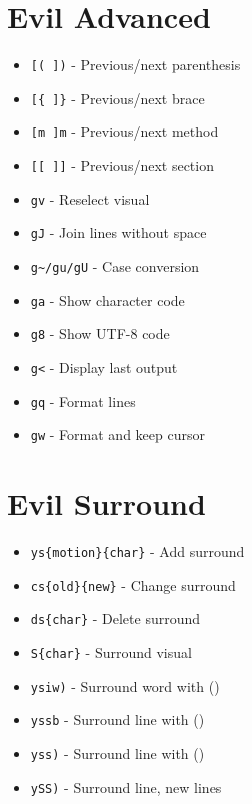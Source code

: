 \documentclass[6pt,landscape]{article}
\newcommand{\key}[1]{\texttt{#1}}
\begin{document}
\begin{multicols*}{5}
\section*{Evil Advanced}
\begin{itemize}[leftmargin=*,itemsep=0pt,parsep=0pt,topsep=0pt]
\item \key{[( ])} - Previous/next parenthesis
\item \key{[\{ ]\}} - Previous/next brace
\item \key{[m ]m} - Previous/next method
\item \key{[[ ]]} - Previous/next section
\item \key{gv} - Reselect visual
\item \key{gJ} - Join lines without space
\item \key{g\textasciitilde/gu/gU} - Case conversion
\item \key{ga} - Show character code
\item \key{g8} - Show UTF-8 code
\item \key{g<} - Display last output
\item \key{gq} - Format lines
\item \key{gw} - Format and keep cursor
\end{itemize}

\section*{Evil Surround}
\begin{itemize}[leftmargin=*,itemsep=0pt,parsep=0pt,topsep=0pt]
\item \key{ys\{motion\}\{char\}} - Add surround
\item \key{cs\{old\}\{new\}} - Change surround
\item \key{ds\{char\}} - Delete surround
\item \key{S\{char\}} - Surround visual
\item \key{ysiw)} - Surround word with ()
\item \key{yssb} - Surround line with ()
\item \key{yss)} - Surround line with ()
\item \key{ySS)} - Surround line, new lines
\end{itemize}


\end{multicols*}
\end{document}
